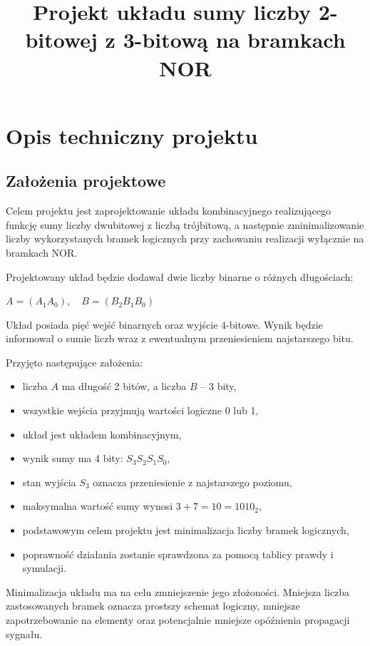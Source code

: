 \documentclass[11pt]{article}
\title{Projekt układu sumy liczby 2-bitowej z 3-bitową na bramkach NOR}
\author{}
\date{}
\begin{document}
\maketitle

\section{Opis techniczny projektu}

\subsection{Założenia projektowe}

Celem projektu jest zaprojektowanie układu kombinacyjnego realizującego funkcję sumy liczby dwubitowej z liczbą trójbitową, a następnie zminimalizowanie liczby wykorzystanych bramek logicznych przy zachowaniu realizacji wyłącznie na bramkach NOR.

Projektowany układ będzie dodawał dwie liczby binarne o różnych długościach:
\begin{center}
$A = (A_1 A_0),\quad B = (B_2 B_1 B_0)$
\end{center}
Układ posiada pięć wejść binarnych oraz wyjście 4-bitowe. Wynik będzie informował o sumie liczb wraz z ewentualnym przeniesieniem najstarszego bitu.

Przyjęto następujące założenia:
\begin{itemize}
    \item liczba \(A\) ma długość 2 bitów, a liczba \(B\) -- 3 bity,
    \item wszystkie wejścia przyjmują wartości logiczne 0 lub 1,
    \item układ jest układem kombinacyjnym,
    \item wynik sumy ma 4 bity: \(S_3 S_2 S_1 S_0\),
    \item stan wyjścia \(S_3\) oznacza przeniesienie z najstarszego poziomu,
    \item maksymalna wartość sumy wynosi \(3 + 7 = 10 = 1010_2\),
    \item podstawowym celem projektu jest minimalizacja liczby bramek logicznych,
    \item poprawność działania zostanie sprawdzona za pomocą tablicy prawdy i symulacji.
\end{itemize}

Minimalizacja układu ma na celu zmniejszenie jego złożoności. Mniejsza liczba zastosowanych bramek oznacza prostszy schemat logiczny, mniejsze zapotrzebowanie na elementy oraz potencjalnie mniejsze opóźnienia propagacji sygnału.
\end{document}

